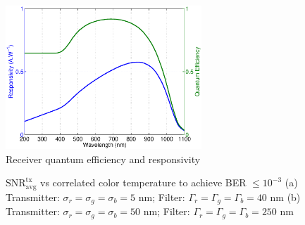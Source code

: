 \begin{figure}[!b]
	\centering
		\includegraphics[trim={0.15in 0.05in 0.05in 0.0in}, clip=true, width=2.9in]{img/RecvResp.eps}
	\caption{Receiver quantum efficiency and responsivity \cite{qeff}}
	\label{fig:RecvResp}
\end{figure}

\begin{figure}[tbph]
\centerline{
\hfil 
{}}
\caption{$\text{SNR}^{\text{tx}}_{\text{avg}}$ vs correlated color temperature to achieve BER $\leq 10^{-3}$ \newline(a) Transmitter: $\sigma_r = \sigma_g = \sigma_b = 5$ nm; Filter: $\Gamma_r = \Gamma_g = \Gamma_b = 40$ nm (b) Transmitter: $\sigma_r = \sigma_g = \sigma_b = 50$ nm; Filter: $\Gamma_r = \Gamma_g = \Gamma_b = 250$ nm}
\label{fig:SNRvsCCT}
\end{figure}
\global\let\figone\relax

